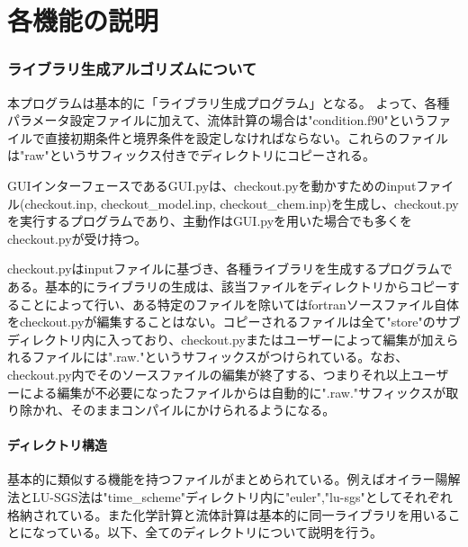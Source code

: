 \documentclass{jsarticle}
\begin{document}
%
%
%
%
%

\part{各機能の説明}
\newpage
\section{ライブラリ生成アルゴリズムについて}%
本プログラムは基本的に「ライブラリ生成プログラム」となる。
よって、各種パラメータ設定ファイルに加えて、流体計算の場合は"condition.f90"というファイルで直接初期条件と境界条件を設定しなければならない。これらのファイルは"raw"というサフィックス付きでディレクトリにコピーされる。

GUIインターフェースであるGUI.pyは、checkout.pyを動かすためのinputファイル(checkout.inp, checkout\_model.inp, checkout\_chem.inp)を生成し、checkout.pyを実行するプログラムであり、主動作はGUI.pyを用いた場合でも多くをcheckout.pyが受け持つ。

checkout.pyはinputファイルに基づき、各種ライブラリを生成するプログラムである。基本的にライブラリの生成は、該当ファイルをディレクトリからコピーすることによって行い、ある特定のファイルを除いてはfortranソースファイル自体をcheckout.pyが編集することはない。コピーされるファイルは全て"store"のサブディレクトリ内に入っており、checkout.pyまたはユーザーによって編集が加えられるファイルには".raw."というサフィックスがつけられている。なお、checkout.py内でそのソースファイルの編集が終了する、つまりそれ以上ユーザーによる編集が不必要になったファイルからは自動的に".raw."サフィックスが取り除かれ、そのままコンパイルにかけられるようになる。
\subsection{ディレクトリ構造}
基本的に類似する機能を持つファイルがまとめられている。例えばオイラー陽解法とLU-SGS法は"time\_scheme"ディレクトリ内に"euler","lu-sgs"としてそれぞれ格納されている。また化学計算と流体計算は基本的に同一ライブラリを用いることになっている。以下、全てのディレクトリについて説明を行う。
\newpage
\end{document}
